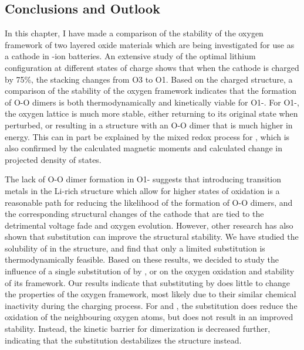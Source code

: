 \begin{refsection}
\pagebreak[4]
\section{Conclusions and Outlook} 

In this chapter, I have made a comparison of the stability of the oxygen 
framework of two layered oxide materials which are being investigated for use 
as a cathode in -ion batteries. An extensive study of the optimal 
lithium configuration at different states of charge shows that when the 
 cathode is charged by 75\%, the stacking changes from O3 to O1.
Based on the charged structure, a comparison of the stability of the oxygen 
framework indicates that the formation of O-O dimers is both thermodynamically 
and kinetically viable for O1-. For O1-, the 
oxygen lattice is much more stable, either returning to its original 
state when perturbed, or resulting in a structure with an O-O dimer that is 
much higher in energy. This can in part be explained by the mixed redox 
process for , which is also confirmed by the calculated magnetic 
moments and calculated change in projected density of states.

The lack of O-O dimer formation in O1- suggests that introducing 
transition metals in the Li-rich structure which allow for higher states of 
oxidation is a reasonable path for reducing the likelihood of the formation of 
O-O dimers, and the corresponding structural changes of the cathode that are 
tied to the detrimental voltage fade and oxygen evolution. However, other 
research has also shown that  substitution can improve the structural 
stability. We have studied the solubility of  in the 
 structure, and find that only a limited substitution 
is thermodynamically feasible. Based on these results, we decided to study 
the influence of a single substitution of  by ,  
or  on the oxygen oxidation and stability of its framework. Our results 
indicate that substituting  by  does little to change the 
properties of the oxygen framework, most likely due to their similar 
chemical inactivity during the charging process. For  and , the 
substitution does reduce the oxidation of the neighbouring oxygen atoms, 
but does not result in an improved stability. Instead, the kinetic barrier 
for dimerization is decreased further, indicating that the substitution 
destabilizes the structure instead. 


\end{refsection}
